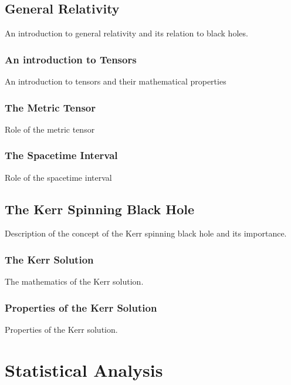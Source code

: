 \documentclass[12pt, oneside]{smuthesis}
\begin{document}
\section{\sc General Relativity} \label{generalRelativity}

An introduction to general relativity and its relation to black holes.

\subsection{\sc An introduction to Tensors} \label{tensorIntro}

An introduction to tensors and their mathematical properties

\subsection{\sc The Metric Tensor} \label{metricTensor}

Role of the metric tensor

\subsection{\sc The Spacetime Interval} \label{spacetimeInterval}

Role of the spacetime interval

\section{\sc The Kerr Spinning Black Hole} \label{kerrSpinningBH}

Description of the concept of the Kerr spinning black hole and its importance.

\subsection{\sc The Kerr Solution} \label{kerrSolution}

The mathematics of the Kerr solution.

\subsection{\sc Properties of the Kerr Solution} \label{kerrSolutionProperties}

Properties of the Kerr solution.

\chapter{\sc Statistical Analysis} \label{statisticalAnalysis}
\end{document}
